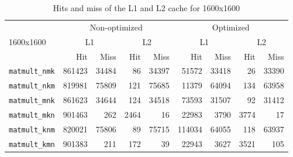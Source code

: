 \begin{table}[!th]
\centering
\begin{tabular}{l|rr|rr|rr|rr}
\multirow{3}{*}{1600x1600} & \multicolumn{4}{|c}{Non-optimized}& \multicolumn{4}{|c}{Optimized}\\
& \multicolumn{2}{|c}{L1} & \multicolumn{2}{|c}{L2}& \multicolumn{2}{|c}{L1} & \multicolumn{2}{|c}{L2} \\
& Hit& Miss& Hit& Miss& Hit& Miss& Hit& Miss\\ \hline
\texttt{matmult\_nmk}& 861423 & 34484 & 86 & 34397 & 51572 & 33418 & 26 & 33390 \\
\texttt{matmult\_nkm}& 819981 & 75809 & 121 & 75685 &11379 & 64094 & 134 & 63958\\
\texttt{matmult\_mnk}& 861623 & 34644 & 124 & 34518 &73593 & 31507 & 92 & 31412\\
\texttt{matmult\_mkn}& 901463 & 262 & 2464 & 16 & 22983 & 3790 & 3774 & 17\\
\texttt{matmult\_knm}& 820021 & 75806 & 89 & 75715 & 114034 & 64055 & 118 & 63937\\
\texttt{matmult\_kmn}& 901383 & 211 & 172 & 39 & 22943 & 3627 & 3521 & 105
\end{tabular}
\caption{Hits and miss of the L1 and L2 cache for 1600x1600}
\label{tab:L1L2hitmis_1600}
\end{table}

\newpage






